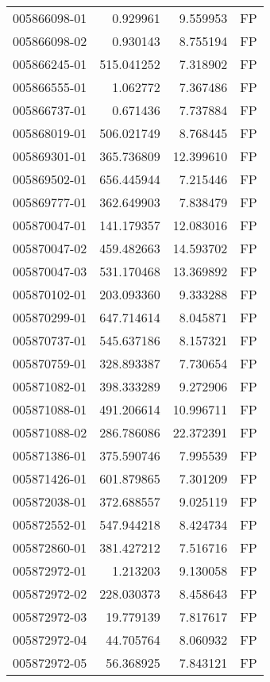 \begin{tabular}{lrrl}
005866098-01 &    0.929961 &     9.559953 &   FP \\
005866098-02 &    0.930143 &     8.755194 &   FP \\
005866245-01 &  515.041252 &     7.318902 &   FP \\
005866555-01 &    1.062772 &     7.367486 &   FP \\
005866737-01 &    0.671436 &     7.737884 &   FP \\
005868019-01 &  506.021749 &     8.768445 &   FP \\
005869301-01 &  365.736809 &    12.399610 &   FP \\
005869502-01 &  656.445944 &     7.215446 &   FP \\
005869777-01 &  362.649903 &     7.838479 &   FP \\
005870047-01 &  141.179357 &    12.083016 &   FP \\
005870047-02 &  459.482663 &    14.593702 &   FP \\
005870047-03 &  531.170468 &    13.369892 &   FP \\
005870102-01 &  203.093360 &     9.333288 &   FP \\
005870299-01 &  647.714614 &     8.045871 &   FP \\
005870737-01 &  545.637186 &     8.157321 &   FP \\
005870759-01 &  328.893387 &     7.730654 &   FP \\
005871082-01 &  398.333289 &     9.272906 &   FP \\
005871088-01 &  491.206614 &    10.996711 &   FP \\
005871088-02 &  286.786086 &    22.372391 &   FP \\
005871386-01 &  375.590746 &     7.995539 &   FP \\
005871426-01 &  601.879865 &     7.301209 &   FP \\
005872038-01 &  372.688557 &     9.025119 &   FP \\
005872552-01 &  547.944218 &     8.424734 &   FP \\
005872860-01 &  381.427212 &     7.516716 &   FP \\
005872972-01 &    1.213203 &     9.130058 &   FP \\
005872972-02 &  228.030373 &     8.458643 &   FP \\
005872972-03 &   19.779139 &     7.817617 &   FP \\
005872972-04 &   44.705764 &     8.060932 &   FP \\
005872972-05 &   56.368925 &     7.843121 &   FP \\

\end{tabular}
